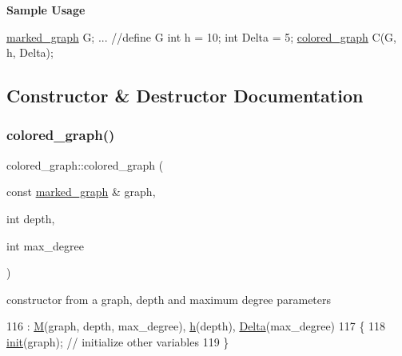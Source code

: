{\bfseries Sample Usage}


\begin{DoxyCode}
\hyperlink{classmarked__graph}{marked\_graph} G;
... \textcolor{comment}{//define G}
\textcolor{keywordtype}{int} h = 10;
\textcolor{keywordtype}{int} Delta = 5;
\hyperlink{classcolored__graph}{colored\_graph} C(G, h, Delta);
\end{DoxyCode}
 

\subsection{Constructor \& Destructor Documentation}
\mbox{\label{classcolored__graph_a0374481a0474ac8e9b77689f74b5ed9b}} 
\subsubsection{\texorpdfstring{colored\+\_\+graph()}{colored\_graph()}\hspace{0.1cm}{\footnotesize\ttfamily [1/2]}}
{\footnotesize\ttfamily colored\+\_\+graph\+::colored\+\_\+graph (\begin{DoxyParamCaption}\item[{const \hyperlink{classmarked__graph}{marked\+\_\+graph} \&}]{graph,  }\item[{int}]{depth,  }\item[{int}]{max\+\_\+degree }\end{DoxyParamCaption})\hspace{0.3cm}{\ttfamily [inline]}}



constructor from a graph, depth and maximum degree parameters 


\begin{DoxyCode}
116                                                                     : \hyperlink{classcolored__graph_ab72c568fe12f7c849ca6bffb145aec47}{M}(graph, depth, max\_degree), 
      \hyperlink{classcolored__graph_ae27062a4ee59df2670d3a0c81e85a3fa}{h}(depth), \hyperlink{classcolored__graph_a5b0e93eb40a20dc815c809dee11edc12}{Delta}(max\_degree)
117   \{
118     \hyperlink{classcolored__graph_a0e867afa9f5491dfc05bed10680f0709}{init}(graph); \textcolor{comment}{// initialize other variables }
119   \}
\end{DoxyCode}
\mbox{\label{classcolored__graph_a104bcd930e68c04e4786678923bfdca1}} 
